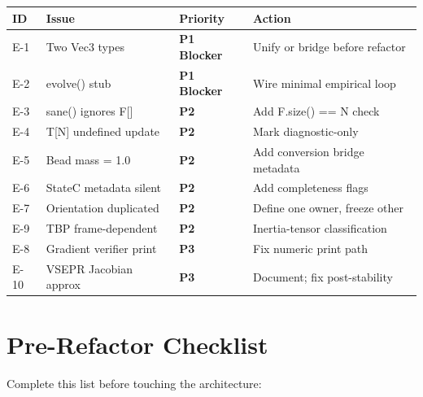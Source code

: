 \documentclass[11pt,a4paper]{article}
\begin{document}
\begin{center}
\begin{tabular}{llll}
\toprule
ID & Issue & Priority & Action \\
\midrule
E-1 & Two Vec3 types          & \textcolor{red1}{\textbf{P1 Blocker}} & Unify or bridge before refactor \\
E-2 & evolve() stub           & \textcolor{red1}{\textbf{P1 Blocker}} & Wire minimal empirical loop \\
E-3 & sane() ignores F[]      & \textcolor{amber}{\textbf{P2}}        & Add F.size() == N check \\
E-4 & T[N] undefined update   & \textcolor{amber}{\textbf{P2}}        & Mark diagnostic-only \\
E-5 & Bead mass = 1.0         & \textcolor{amber}{\textbf{P2}}        & Add conversion bridge metadata \\
E-6 & StateC metadata silent  & \textcolor{amber}{\textbf{P2}}        & Add completeness flags \\
E-7 & Orientation duplicated  & \textcolor{amber}{\textbf{P2}}        & Define one owner, freeze other \\
E-9 & TBP frame-dependent     & \textcolor{amber}{\textbf{P2}}        & Inertia-tensor classification \\
E-8 & Gradient verifier print & \textcolor{gray1}{\textbf{P3}}        & Fix numeric print path \\
E-10 & VSEPR Jacobian approx  & \textcolor{gray1}{\textbf{P3}}        & Document; fix post-stability \\
\bottomrule
\end{tabular}
\end{center}

\section{Pre-Refactor Checklist}

Complete this list before touching the architecture:
\end{document}
